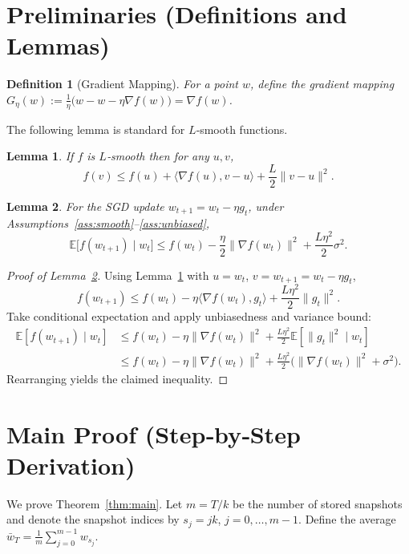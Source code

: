 \documentclass{article}
\newtheorem{lemma}{Lemma}
\newtheorem{definition}{Definition}
\newcommand{\E}{\mathbb{E}}
\begin{document}
\newpage
\section*{Preliminaries (Definitions and Lemmas)}
\begin{definition}[Gradient Mapping]
For a point $w$, define the gradient mapping $G_\eta(w):=\frac{1}{\eta}\bigl(w-w-\eta\nabla f(w)\bigr)=\nabla f(w)$.
\end{definition}
The following lemma is standard for $L$‑smooth functions.
\begin{lemma}
\label{lem:smoothness}
If $f$ is $L$‑smooth then for any $u,v$,
\[
    f(v)\le f(u)+\langle\nabla f(u),v-u\rangle+\frac{L}{2}\|v-u\|^2 .
\]
\end{lemma}
\begin{lemma}
\label{lem:sgd_one_step}
For the SGD update $w_{t+1}=w_t-\eta g_t$, under Assumptions~\ref{ass:smooth}–\ref{ass:unbiased},
\[
    \E\bigl[f(w_{t+1})\mid w_t\bigr]
    \le f(w_t)-\frac{\eta}{2}\|\nabla f(w_t)\|^2
          +\frac{L\eta^2}{2}\sigma^2 .
\]
\end{lemma}
\begin{proof}[Proof of Lemma~\ref{lem:sgd_one_step}]
Using Lemma~\ref{lem:smoothness} with $u=w_t$, $v=w_{t+1}=w_t-\eta g_t$,
\[
    f(w_{t+1})\le f(w_t)-\eta\langle\nabla f(w_t),g_t\rangle+\frac{L\eta^2}{2}\|g_t\|^2 .
\]
Take conditional expectation and apply unbiasedness and variance bound:
\[
\begin{aligned}
    \E\!\left[f(w_{t+1})\mid w_t\right]
    &\le f(w_t)-\eta\|\nabla f(w_t)\|^2
          +\frac{L\eta^2}{2}\E\!\left[\|g_t\|^2\mid w_t\right] \\
    &\le f(w_t)-\eta\|\nabla f(w_t)\|^2
          +\frac{L\eta^2}{2}\bigl(\|\nabla f(w_t)\|^2+\sigma^2\bigr) .
\end{aligned}
\]
Rearranging yields the claimed inequality. \qedhere
\end{proof}

\section*{Main Proof (Step‑by‑Step Derivation)}
We prove Theorem~\ref{thm:main}. Let $m=T/k$ be the number of stored snapshots and denote the snapshot indices by $s_j=jk$, $j=0,\dots,m-1$. Define the average $\bar w_T=\frac{1}{m}\sum_{j=0}^{m-1} w_{s_j}$.
\end{document}
